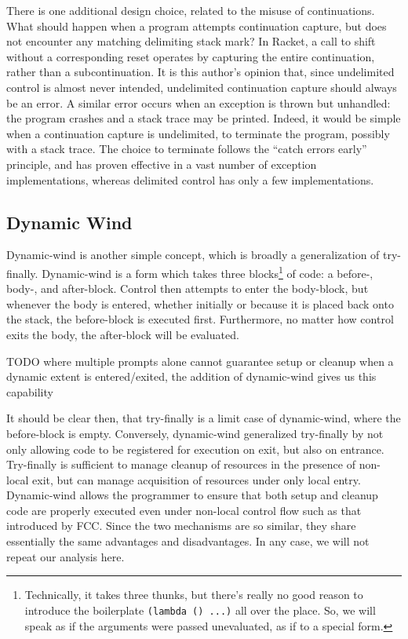\documentclass[11pt]{article}
\newcommand{\maybePage}{\newpage}
\begin{document}
There is one additional design choice, related to the misuse of continuations.
What should happen when a program attempts continuation capture, but does not encounter any matching delimiting stack mark?
In Racket, a call to shift without a corresponding reset operates by capturing the entire continuation, rather than a subcontinuation.
It is this author's opinion that, since undelimited control is almost never intended, undelimited continuation capture should always be an error.
A similar error occurs when an exception is thrown but unhandled: the program crashes and a stack trace may be printed.
Indeed, it would be simple when a continuation capture is undelimited, to terminate the program, possibly with a stack trace.
The choice to terminate follows the ``catch errors early'' principle, and  has proven effective in a vast number of exception implementations, whereas delimited control has only a few implementations.

\maybePage
\subsection{Dynamic Wind}
\label{dynamic-wind}

Dynamic-wind is another simple concept, which is broadly a generalization of try-finally.
Dynamic-wind is a form which takes three blocks\footnote{Technically, it takes three thunks, but there's really no good reason to introduce the boilerplate \texttt{(lambda () ...)} all over the place. So, we will speak as if the arguments were passed unevaluated, as if to a special form.} of code: a before-, body-, and after-block.
Control then attempts to enter the body-block, but whenever the body is entered, whether initially or because it is placed back onto the stack, the before-block is executed first.
Furthermore, no matter how control exits the body, the after-block will be evaluated.

TODO where multiple prompts alone cannot guarantee setup or cleanup when a dynamic extent is entered/exited, the addition of dynamic-wind gives us this capability

It should be clear then, that try-finally is a limit case of dynamic-wind, where the before-block is empty.
Conversely, dynamic-wind generalized try-finally by not only allowing code to be registered for execution on exit, but also on entrance.
Try-finally is sufficient to manage cleanup of resources in the presence of non-local exit, but can manage acquisition of resources under only local entry.
Dynamic-wind allows the programmer to ensure that both setup and cleanup code are properly executed even under non-local control flow such as that introduced by FCC.
Since the two mechanisms are so similar, they share essentially the same advantages and disadvantages.
In any case, we will not repeat our analysis here.
\end{document}
